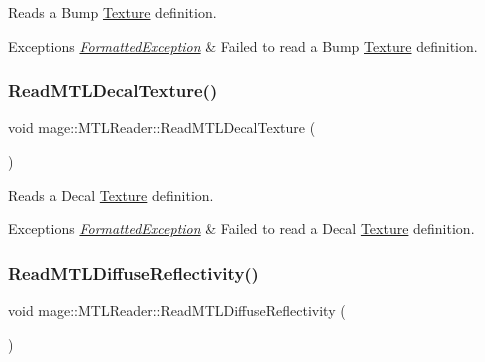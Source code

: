 Reads a Bump \hyperlink{classmage_1_1_texture}{Texture} definition.


\begin{DoxyExceptions}{Exceptions}
{\em \hyperlink{structmage_1_1_formatted_exception}{Formatted\+Exception}} & Failed to read a Bump \hyperlink{classmage_1_1_texture}{Texture} definition. \\
\hline
\end{DoxyExceptions}
\hypertarget{classmage_1_1_m_t_l_reader_a578df3a55c79fba9d46616791b2e5539}{}\label{classmage_1_1_m_t_l_reader_a578df3a55c79fba9d46616791b2e5539} 
\subsubsection{\texorpdfstring{Read\+M\+T\+L\+Decal\+Texture()}{ReadMTLDecalTexture()}}
{\footnotesize\ttfamily void mage\+::\+M\+T\+L\+Reader\+::\+Read\+M\+T\+L\+Decal\+Texture (\begin{DoxyParamCaption}{ }\end{DoxyParamCaption})\hspace{0.3cm}{\ttfamily [private]}}

Reads a Decal \hyperlink{classmage_1_1_texture}{Texture} definition.


\begin{DoxyExceptions}{Exceptions}
{\em \hyperlink{structmage_1_1_formatted_exception}{Formatted\+Exception}} & Failed to read a Decal \hyperlink{classmage_1_1_texture}{Texture} definition. \\
\hline
\end{DoxyExceptions}
\hypertarget{classmage_1_1_m_t_l_reader_accd087a8e5b2d489b83f70ecf0fe0d18}{}\label{classmage_1_1_m_t_l_reader_accd087a8e5b2d489b83f70ecf0fe0d18} 
\subsubsection{\texorpdfstring{Read\+M\+T\+L\+Diffuse\+Reflectivity()}{ReadMTLDiffuseReflectivity()}}
{\footnotesize\ttfamily void mage\+::\+M\+T\+L\+Reader\+::\+Read\+M\+T\+L\+Diffuse\+Reflectivity (\begin{DoxyParamCaption}{ }\end{DoxyParamCaption})\hspace{0.3cm}{\ttfamily [private]}}

